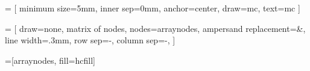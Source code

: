 \usepackage{textcomp}
\usepackage{amsopn, amsmath, amssymb}
\usepackage{booktabs}

\newcommand{\myproc}[1]{\text{\textsc{\text{#1}}}}
\newcommand{\myvar}[1]{\text{\sl #1}}


\usepackage{tikz}
\usepackage{tikz-qtree}
\usepackage{pgfplots}

\usetikzlibrary{
	positioning, 
	matrix, 
	calc,
	arrows,
	shapes,
	fit,
	decorations,
	decorations.pathmorphing
}


 = [
	minimum size=5mm, 
	inner sep=0mm,
	anchor=center,
	draw=mc,
	text=mc
]

 = [
	draw=none,
	matrix of nodes,
	nodes={arraynodes},
	ampersand replacement=\&,
	line width=.3mm,
	row sep=-\pgflinewidth,
	column sep=-\pgflinewidth,
]

=[arraynodes, fill=hcfill]

\newcommand{\logo}{
	\path[use as bounding box] (-2.6, -2.6) rectangle (2.6, 2.6);
	\draw[rounded corners] (-2.5, -2.5) rectangle (2.5, 2.5);
}

\newenvironment{pseudocode}
	{\hrule\medskip}
	{\medskip\hrule}